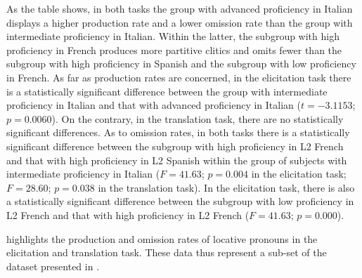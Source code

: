 \documentclass[output=paper,modfonts,nonflat,newtxmath]{langsci/langscibook}
\begin{document}
As the table shows, in both tasks the group with advanced proficiency in Italian displays a higher production rate and a lower omission rate than the group with intermediate proficiency in Italian. Within the latter, the subgroup with high proficiency in French produces more partitive clitics and omits fewer than the subgroup with high proficiency in Spanish and the subgroup with low proficiency in French. As far as production rates are concerned, in the elicitation task there is a statistically significant difference between the group with intermediate proficiency in Italian and that with advanced proficiency in Italian ($t = -3.1153$; $p = 0.0060$). On the contrary, in the translation task, there are no statistically significant differences. As to omission rates, in both tasks there is a statistically significant difference between the subgroup with high proficiency in L2 French and that with high proficiency in L2 Spanish within the group of subjects with intermediate proficiency in Italian ($F = 41.63$; $p = 0.004$ in the elicitation task; $F = 28.60$; $p = 0.038$ in the translation task). In the elicitation task, there is also a statistically significant difference between the subgroup with low proficiency in L2 French and that with high proficiency in L2 French ($F = 41.63$; $p = 0.000$).



 highlights the production and omission rates of locative pronouns in the elicitation and translation task. These data thus represent a sub-set of the dataset presented in .
\end{document}

